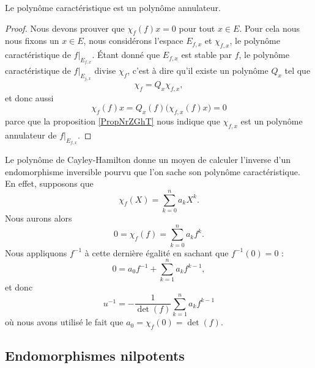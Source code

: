 \begin{theorem}   \label{ThoCalYWLbJQ}
    Le polynôme caractéristique est un polynôme annulateur.
\end{theorem}

\begin{proof}
    Nous devons prouver que \( \chi_f(f)x=0\) pour tout \( x\in E\). Pour cela nous nous fixons un \( x\in E\), nous considérons l'espace \( E_{f,x}\) et \( \chi_{f,x}\), le polynôme caractéristique de \( f|_{E_{f,x}}\). Étant donné que \( E_{f,x}\) est stable par \( f\), le polynôme caractéristique de \( f|_{E_{j,x}}\) divise \( \chi_f\), c'est à dire qu'il existe un polynôme \( Q_x\) tel que
    \begin{equation}
        \chi_f=Q_x\chi_{f,x},
    \end{equation}
    et donc aussi
    \begin{equation}
        \chi_f(f)x=Q_x(f)\big( \chi_{f,x}(f)x \big)=0
    \end{equation}
    parce que la proposition \ref{PropNrZGhT} nous indique que \( \chi_{f,x}\) est un polynôme annulateur de \( f|_{E_{f,x}}\).
\end{proof}

Le polynôme de Cayley-Hamilton donne un moyen de calculer l'inverse d'un endomorphisme inversible pourvu que l'on sache son polynôme caractéristique. En effet, supposons que
\begin{equation}
    \chi_f(X)=\sum_{k=0}^na_kX^k.
\end{equation}
Nous aurons alors
\begin{equation}
    0=\chi_f(f)=\sum_{k=0}^na_kf^k.
\end{equation}
Nous appliquons \( f^{-1}\) à cette dernière égalité en sachant que \( f^{-1}(0)=0\) :
\begin{equation}
    0=a_0f^{-1}+\sum_{k=1}^na_kf^{k-1},
\end{equation}
et donc
\begin{equation}
    u^{-1}=-\frac{1}{ \det(f) }\sum_{k=1}^na_kf^{k-1}
\end{equation}
où nous avons utilisé le fait que \( a_0=\chi_f(0)=\det(f)\).

\subsection{Endomorphismes nilpotents}

